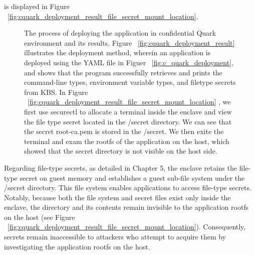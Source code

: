 is displayed in Figure ~\ref{fig:cquark_deployment_result_file_secret_mount_location}.
\begin{figure}[H]

    
    
    \caption[The process of deploying the application in confidential Quark environment and its results.]{The process of deploying the application in confidential Quark environment and its results. Figure ~\ref{fig:cquark_deployment_result} illustrates the deployment method, wherein an application is deployed using the YAML file in Figuer ~\ref{fig:c_quark_deployment},  
    and shows that the program successfully retrieves and prints the command-line types, environment variable types, and file\-type secrets from KBS. In Figure ~\ref{fig:cquark_deployment_result_file_secret_mount_location} , we first use securectl to allocate a terminal inside the enclave and view the file type secret located in the /secret directory. 
    We can see that the secret root-ca.pem is stored in the /secret. We then exite the terminal and exam the rootfs of the application on the host, which showed that the secret directory is not visible on the host side.}
\end{figure}


Regarding file-type secrets, as detailed in Chapter 5, the enclave retains the file-type secret on guest memory and establishes a guest sub-file system under the /secret directory. This file system enables applications to access file-type secrets. Notably, because both the file system and secret 
files exist only inside the enclave, the directory and its contents remain invisible to the application rootfs on the host (see Figure ~\ref{fig:cquark_deployment_result_file_secret_mount_location}). Consequently, secrets remain inaccessible to attackers who attempt to acquire them by investigating the application rootfs on the host.



